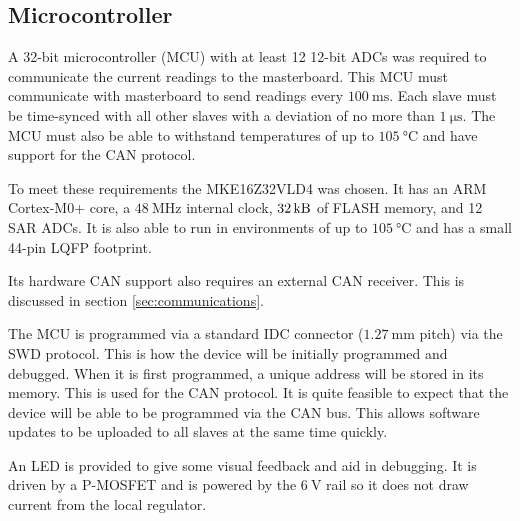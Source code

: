 \subsection{Microcontroller}
\label{sec:microcontroller}

A 32-bit microcontroller (MCU) with at least 12 12-bit ADCs was required to communicate the current readings to the masterboard.
This MCU must communicate with masterboard to send readings every $\SI{100}{\milli\second}$.
Each slave must be time-synced with all other slaves with a deviation of no more than $\SI{1}{\micro\second}$.
The MCU must also be able to withstand temperatures of up to $\SI{105}{\degreeCelsius}$ and have support for the CAN protocol.

To meet these requirements the MKE16Z32VLD4 was chosen.
It has an ARM Cortex-M0+ core, a $\SI{48}{\mega\hertz}$ internal clock, $\SI{32}{\kilo\byte}$ of FLASH memory, and 12 SAR ADCs.
It is also able to run in environments of up to $\SI{105}{\degreeCelsius}$ and has a small 44-pin LQFP footprint.

Its hardware CAN support also requires an external CAN receiver.
This is discussed in section \ref{sec:communications}.

The MCU is programmed via a standard IDC connector ($\SI{1.27}{\milli\metre}$ pitch) via the SWD protocol.
This is how the device will be initially programmed and debugged.
When it is first programmed, a unique address will be stored in its memory. This is used for the CAN protocol.
It is quite feasible to expect that the device will be able to be programmed via the CAN bus.
This allows software updates to be uploaded to all slaves at the same time quickly.

An LED is provided to give some visual feedback and aid in debugging.
It is driven by a P-MOSFET and is powered by the $\SI{6}{\volt}$ rail so it does not draw current from the local regulator.

